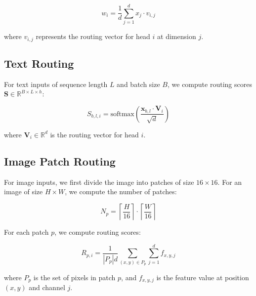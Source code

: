 \documentclass[10pt,journal,compsoc]{IEEEtran}
\begin{document}
\begin{equation}
    w_i = \frac{1}{d}\sum_{j=1}^d x_j \cdot v_{i,j}
\end{equation}

where $v_{i,j}$ represents the routing vector for head $i$ at dimension $j$.

\subsection{Text Routing}
For text inputs of sequence length $L$ and batch size $B$, we compute routing scores $\mathbf{S} \in \mathbb{R}^{B \times L \times h}$:

\begin{equation}
    S_{b,l,i} = \text{softmax}\left(\frac{\mathbf{x}_{b,l} \cdot \mathbf{V}_i}{\sqrt{d}}\right)
\end{equation}

where $\mathbf{V}_i \in \mathbb{R}^d$ is the routing vector for head $i$.

\subsection{Image Patch Routing}
For image inputs, we first divide the image into patches of size $16 \times 16$. For an image of size $H \times W$, we compute the number of patches:

\begin{equation}
    N_p = \left\lceil\frac{H}{16}\right\rceil \cdot \left\lceil\frac{W}{16}\right\rceil
\end{equation}

For each patch $p$, we compute routing scores:

\begin{equation}
    R_{p,i} = \frac{1}{|P_p|d}\sum_{(x,y) \in P_p}\sum_{j=1}^d f_{x,y,j}
\end{equation}

where $P_p$ is the set of pixels in patch $p$, and $f_{x,y,j}$ is the feature value at position $(x,y)$ and channel $j$.
\end{document}
